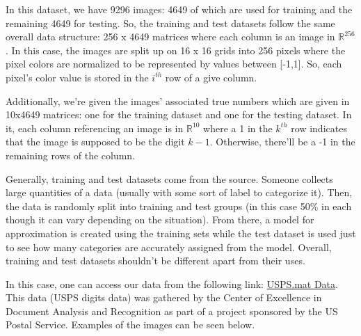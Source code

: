 \documentclass[dvipsnames,12pt]{article} %
\begin{document}
    \hskip 12pt In this dataset, we have 9296 images: 4649 of which are used for training and the remaining 4649 for testing. So, the training and test datasets follow the same overall data structure: 256 x 4649 matrices where each column is an image in $\mathbb{R}^{256}$. In this case, the images are split up on 16 x 16 grids into 256 pixels where the pixel colors are normalized to be represented by values between [-1,1]. So, each pixel's color value is stored in the $i^{th}$ row of a give column.

    \vskip 06pt

    \hskip 12pt Additionally, we're given the images' associated true numbers which are given in 10x4649 matrices: one for the training dataset and one for the testing dataset. In it, each column referencing an image is in $\mathbb{R}^{10}$ where a 1 in the $k^{th}$ row indicates that the image is supposed to be the digit $k-1$. Otherwise, there'll be a -1 in the remaining rows of the column.

    \vskip 06pt

    \hskip 12pt Generally, training and test datasets come from the source. Someone collects large quantities of a data (usually with some sort of label to categorize it). Then, the data is randomly split into training and test groups (in this case 50\% in each though it can vary depending on the situation). From there, a model for approximation is created using the training sets while the test dataset is used just to see how many categories are accurately assigned from the model. Overall, training and test datasets shouldn't be different apart from their uses.

    \vskip 06pt

    \hskip 12pt In this case, one can access our data from the following link: \href{http://www.gaussianprocess.org/gpml/data/}{USPS.mat Data}. This data (USPS digits data) was gathered by the Center of Excellence in Document Analysis and Recognition as part of a project sponsored by the US Postal Service. Examples of the images can be seen below.
\end{document}

